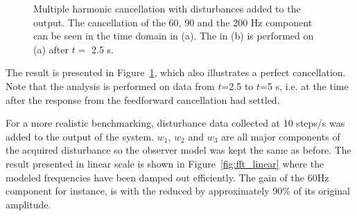 \begin{figure}[h!]
  \centering %
  \qquad
  \caption{\label{fig:3_dist_both} Multiple harmonic cancellation with disturbances added to the output. The cancellation of the 60, 90 and the 200 Hz component can be seen in the time domain in (a). The \abbrFFT in (b) is performed on (a) after $t=$ 2.5 s.}
\end{figure}

The result is presented in Figure~\ref{fig:3_dist_both}, which also illustrates a perfect cancellation. Note that the \abbrFFT analysis is performed on data from $t$=2.5 to $t$=5 s, i.e. at the time after the response from the feedforward cancellation had settled.

For a more realistic benchmarking, disturbance data collected at 10 steps/s was added to the output of the system. $w_1$, $w_2$ and $w_3$ are all major components of the acquired disturbance so the observer model was kept the same as before. The result presented in linear scale is shown in Figure~\ref{fig:fft_linear} where the modeled frequencies have been damped out efficiently. The gain of the 60Hz component for instance, is with the \abbrRFDC reduced by approximately 90\% of its original amplitude.

